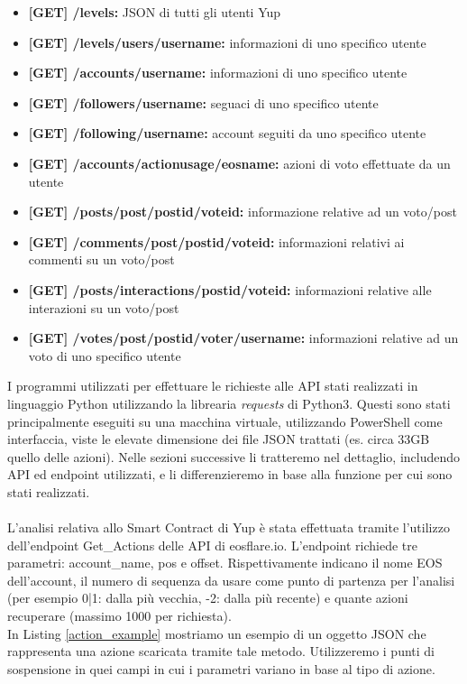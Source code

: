 \begin{itemize}
    \item \textbf{[GET] /levels:} JSON di tutti gli utenti Yup
    \item \textbf{[GET] /levels/users/{username}:} informazioni di uno specifico utente
    \item \textbf{[GET] /accounts/{username}:} informazioni di uno specifico utente
    \item \textbf{[GET] /followers/{username}:} seguaci di uno specifico utente
    \item \textbf{[GET] /following/{username}:} account seguiti da uno specifico utente
    \item \textbf{[GET] /accounts/actionusage/{eosname}:} azioni di voto effettuate da un utente
\end{itemize}

\begin{itemize}
    \item \textbf{[GET] /posts/post/{postid}/{voteid}:} informazione relative ad un voto/post
    \item \textbf{[GET] /comments/post/{postid}/{voteid}:} informazioni relativi ai commenti su un voto/post
    \item \textbf{[GET] /posts/interactions/{postid}/{voteid}:} informazioni relative alle interazioni su un voto/post
    \item \textbf{[GET] /votes/post/{postid}/voter/{username}:} informazioni relative ad un voto di uno specifico utente
\end{itemize}

I programmi utilizzati per effettuare le richieste alle API stati realizzati in linguaggio Python utilizzando la librearia \textit{requests} di Python3. Questi sono stati principalmente eseguiti su una macchina virtuale, utilizzando PowerShell come interfaccia, viste le elevate dimensione dei file JSON trattati (es. circa 33GB quello delle azioni).
Nelle sezioni successive li tratteremo nel dettaglio, includendo API ed endpoint utilizzati, e li differenzieremo in base alla funzione per cui sono stati realizzati.
\\
\\
L'analisi relativa allo Smart Contract di Yup è stata effettuata tramite l'utilizzo dell'endpoint Get\_Actions delle API di eosflare.io. L'endpoint richiede tre parametri: account\_name, pos e offset. Rispettivamente indicano il nome EOS dell'account, il numero di sequenza da usare come punto di partenza per l'analisi (per esempio 0|1: dalla più vecchia, -2: dalla più recente) e quante azioni recuperare (massimo 1000 per richiesta).
\\
In Listing \ref{action_example} mostriamo un esempio di un oggetto JSON che rappresenta una azione scaricata tramite tale metodo. Utilizzeremo i punti di sospensione in quei campi in cui i parametri variano in base al tipo di azione.

